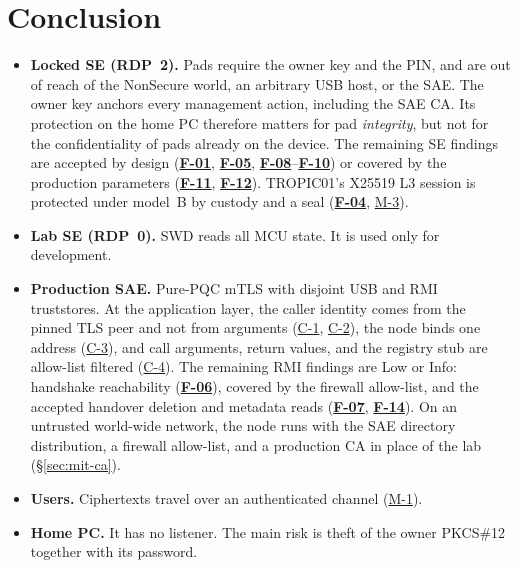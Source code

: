 \documentclass[11pt,a4paper]{article}
\newcommand{\fid}[1]{\textbf{#1}}
\begin{document}
\section{Conclusion}
\begin{itemize}
\item \textbf{Locked SE (RDP~2).} Pads require the owner key and the PIN, and are out of reach of the NonSecure world, an arbitrary USB host, or the SAE. The owner key anchors every management action, including the SAE CA. Its protection on the home PC therefore matters for pad \emph{integrity}, but not for the confidentiality of pads already on the device. The remaining SE findings are accepted by design (\hyperref[f:F-01]{\fid{F-01}}, \hyperref[f:F-05]{\fid{F-05}}, \hyperref[f:F-08]{\fid{F-08}}--\hyperref[f:F-10]{\fid{F-10}}) or covered by the production parameters (\hyperref[f:F-11]{\fid{F-11}}, \hyperref[f:F-12]{\fid{F-12}}). TROPIC01's X25519 L3 session is protected under model~B by custody and a seal (\hyperref[f:F-04]{\fid{F-04}}, \hyperref[m:M-3]{M-3}).
\item \textbf{Lab SE (RDP~0).} SWD reads all MCU state. It is used only for development.
\item \textbf{Production SAE.} Pure-PQC mTLS with disjoint USB and RMI truststores. At the application layer, the caller identity comes from the pinned TLS peer and not from arguments (\hyperref[c:C-1]{C-1}, \hyperref[c:C-2]{C-2}), the node binds one address (\hyperref[c:C-3]{C-3}), and call arguments, return values, and the registry stub are allow-list filtered (\hyperref[c:C-4]{C-4}). The remaining RMI findings are Low or Info: handshake reachability (\hyperref[f:F-06]{\fid{F-06}}), covered by the firewall allow-list, and the accepted handover deletion and metadata reads (\hyperref[f:F-07]{\fid{F-07}}, \hyperref[f:F-14]{\fid{F-14}}). On an untrusted world-wide network, the node runs with the SAE directory distribution, a firewall allow-list, and a production CA in place of the lab  (\S\ref{sec:mit-ca}).
\item \textbf{Users.} Ciphertexts travel over an authenticated channel (\hyperref[m:M-1]{M-1}).
\item \textbf{Home PC.} It has no listener. The main risk is theft of the owner PKCS\#12 together with its password.
\end{itemize}
\appendix
\end{document}
